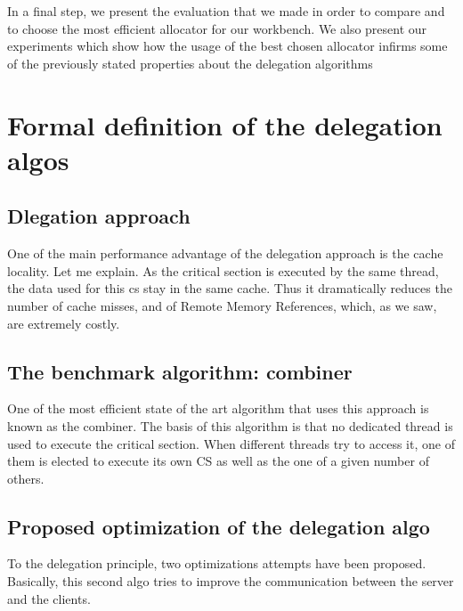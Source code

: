\documentclass[10pt]{article}											%
\begin{document}
		In a final step, we present the evaluation that we made in order to compare and to choose the most efficient allocator for our workbench.   We also present our experiments which show how the usage of the best chosen allocator infirms some of the previously stated properties about the delegation algorithms 






\newpage

\section{Formal definition of the delegation algos}
\subsection{Dlegation approach}
One of the main performance advantage of the delegation approach is the cache locality.   Let me explain.  As the critical section is executed by the same thread, the data used for this cs stay in the same cache.   Thus it dramatically reduces the number of cache misses, and of Remote Memory References, which, as we saw, are extremely costly.



\subsection{The benchmark algorithm: combiner}
One of the most efficient state of the art algorithm that uses this approach is known as the combiner.   The basis of this algorithm is that no dedicated thread is used to execute the critical section.   When different threads try to access it, one of them is elected to execute its own CS as well as the one of a given number of others.



\subsection{Proposed optimization of the delegation algo}
To the delegation principle, two optimizations attempts have been proposed.   Basically, this second algo tries to improve the communication between the server and the clients.
\end{document}
